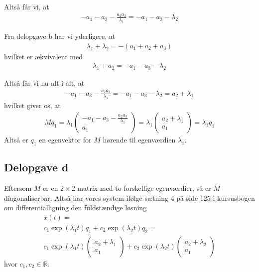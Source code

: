 \documentclass[12pt]{article}
\begin{document}
Altså får vi, at
\begin{align}
- a_1 - a_3 - \frac{a_2a_3}{\lambda_1} = - a_1 - a_3 - \lambda_2
\end{align}

Fra delopgave b har vi yderligere, at
\begin{align}
\lambda_1 + \lambda_2 = -(a_1 + a_2 + a_3)
\end{align}
hvilket er ækvivalent med
\begin{align}
\lambda_1 + a_2 = - a_1 - a_3 - \lambda_2
\end{align}

Altså får vi nu alt i alt, at 
\begin{align}
- a_1 - a_3 - \frac{a_2a_3}{\lambda_1} = - a_1 - a_3 - \lambda_2 = a_2 + \lambda_1
\end{align}
hvilket giver os, at
\begin{align}
Mq_1 = \lambda_1 \begin{pmatrix}
-a_1 - a_3 - \frac{a_2a_3}{\lambda_1}\\
a_1
\end{pmatrix} = \lambda_1 \begin{pmatrix}
a_2 + \lambda_1\\
a_1
\end{pmatrix} = \lambda_1 q_1
\end{align}
Altså er $q_1$ en egenvektor for $M$ hørende til egenværdien $\lambda_1$.

\subsection{Delopgave d}
Eftersom $M$ er en $2\times 2$ matrix med to forskellige egenværdier, så er $M$ diagonaliserbar. Altså har vores system ifølge sætning 4 på side 125 i kursusbogen om differentialligning den fuldstændige løsning
\begin{align}
x(t) = \\ 
c_1\exp(\lambda_1 t) q_1 + c_2\exp(\lambda_2t)q_2 = \\ 
c_1\exp(\lambda_1 t)\begin{pmatrix}
a_2 + \lambda_1\\
a_1
\end{pmatrix}  + c_2\exp(\lambda_2t)\begin{pmatrix}
a_2 + \lambda_2\\
a_1
\end{pmatrix}
\end{align}
hvor $c_1, c_2 \in \mathbb{R}$.
\end{document}
